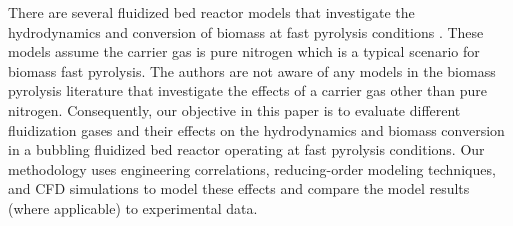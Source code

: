 There are several fluidized bed reactor models that investigate the hydrodynamics and conversion of biomass at fast pyrolysis conditions \cite{Papadikis-2009, Papadikis-2010, Mellin-2014, Xiong-2016, Xue-2011}. These models assume the carrier gas is pure nitrogen which is a typical scenario for biomass fast pyrolysis. The authors are not aware of any models in the biomass pyrolysis literature that investigate the effects of a carrier gas other than pure nitrogen. Consequently, our objective in this paper is to evaluate different fluidization gases and their effects on the hydrodynamics and biomass conversion in a bubbling fluidized bed reactor operating at fast pyrolysis conditions. Our methodology uses engineering correlations, reducing-order modeling techniques, and CFD simulations to model these effects and compare the model results (where applicable) to experimental data.
